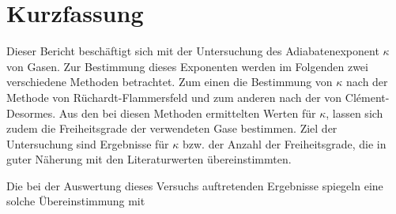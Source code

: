 \section{Kurzfassung}

	Dieser Bericht beschäftigt sich mit der Untersuchung des Adiabatenexponent $\kappa$ von Gasen.
	Zur Bestimmung dieses Exponenten werden im Folgenden zwei verschiedene Methoden betrachtet.
	Zum einen die Bestimmung von $\kappa$ nach der Methode von Rüchardt-Flammersfeld und zum anderen nach der von Clément-Desormes.
	Aus den bei diesen Methoden ermittelten Werten für $\kappa$, lassen sich zudem die Freiheitsgrade der verwendeten Gase bestimmen.
	Ziel der Untersuchung sind Ergebnisse für $\kappa$ bzw. der Anzahl der Freiheitsgrade, die in guter Näherung mit den Literaturwerten übereinstimmten. 
	
	Die bei der Auswertung dieses Versuchs auftretenden Ergebnisse spiegeln eine solche Übereinstimmung mit %